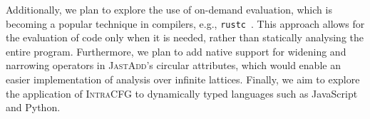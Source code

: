 Additionally, we plan to explore the use of on-demand evaluation, which is becoming a popular
technique in compilers, e.g., \texttt{rustc}~\cite{Rust_Query_Guide}. This approach allows for the
evaluation of code only when it is needed, rather than statically analysing the
entire program. Furthermore, we plan to add native support for widening and narrowing
operators in \textsc{JastAdd}'s circular attributes, which would enable an easier implementation
of analysis over infinite lattices. Finally, we aim to explore the application of \textsc{IntraCFG} to
dynamically typed languages such as JavaScript and Python.